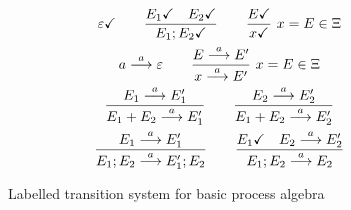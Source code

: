 \begin{figure}[tp]
  \begin{gather*}
    \varepsilon \checkmark \qquad
    \frac{E_1 \checkmark\quad E_2 \checkmark}{E_1;E_2 \checkmark} \qquad
    \frac{E \checkmark}{x \checkmark}~x=E \in\Xi
    \\
    {a \stackrel{a}{\longrightarrow} \varepsilon }
    \qquad
    \frac{E \stackrel{a}{\longrightarrow} E'}{x \stackrel{a}{\longrightarrow} E'}
    ~x=E \in \Xi
    \\
    \frac{E_1 \stackrel{a}{\longrightarrow} E_1'}{E_1 + E_2 \stackrel{a}{\longrightarrow} E_1'}
    \qquad
    \frac{E_2 \stackrel{a}{\longrightarrow} E_2'}{E_1 + E_2 \stackrel{a}{\longrightarrow} E_2'}
    \\
    \frac{E_1 \stackrel{a}{\longrightarrow} E_1'}{E_1; E_2 \stackrel{a}{\longrightarrow} E_1';E_2}
    \qquad
    \frac{E_1 \checkmark \quad E_2 \stackrel{a}{\longrightarrow} E_2'}{E_1; E_2 \stackrel{a}{\longrightarrow}
      E_2}
  \end{gather*}
  \caption{Labelled transition system for basic process algebra}
  \label{fig:lts-bpa}
\end{figure}

